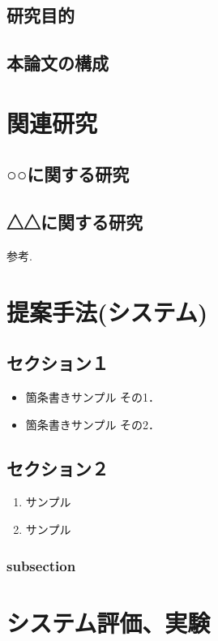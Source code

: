 \documentclass[a4j,10.5pt]{jreport}
\begin{document}
\section{研究目的}

\section{本論文の構成}

\chapter{関連研究}
\section{○○に関する研究}
\section{△△に関する研究}

参考\cite{cite1}.

\chapter{提案手法(システム)}
\section{セクション１}
\begin{itemize}
 \item 箇条書きサンプル その1．
 \item 箇条書きサンプル その2．
\end{itemize}

\section{セクション２}
\begin{enumerate}
    \item サンプル
    \item サンプル
\end{enumerate}

\subsection{subsection}

\chapter{システム評価、実験}
\end{document}
